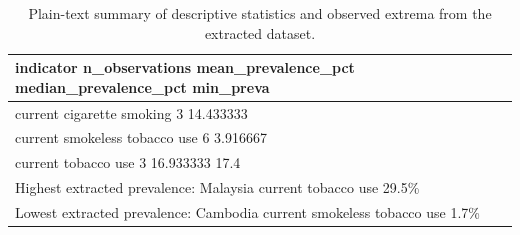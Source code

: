 \documentclass[11pt]{article}
\begin{document}
\begin{table}[t]
\centering
\caption{Plain-text summary of descriptive statistics and observed extrema from the extracted dataset.}
\label{tab:artifact-4}
\begin{tabular}{l}
\toprule
indicator  n\_observations  mean\_prevalence\_pct  median\_prevalence\_pct  min\_preva \\
\midrule
current cigarette smoking               3            14.433333                   \\
current smokeless tobacco use               6             3.916667               \\
current tobacco use               3            16.933333                   17.4  \\
Highest extracted prevalence: Malaysia current tobacco use 29.5\% \\
Lowest extracted prevalence: Cambodia current smokeless tobacco use 1.7\% \\
\bottomrule
\end{tabular}
\end{table}



\end{document}
